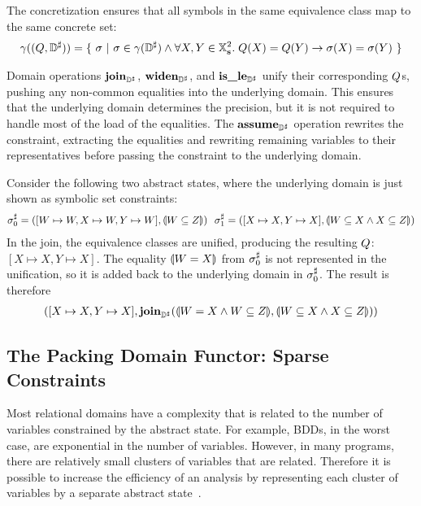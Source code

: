 The concretization ensures that all symbols in the same equivalence class map to the same concrete set:
\begin{align*}
\gamma((Q,{\mathbb{D}}^{\sharp})) = \{ \ \sigma \ | \ \sigma \in \gamma({\mathbb{D}}^{\sharp}) \wedge \forall X,Y \in \mathbb{X}_{\bf s}^2. \; Q(X) = Q(Y) \rightarrow \sigma(X) = \sigma(Y) \ \}
\end{align*}

Domain operations $\textbf{join}_{{\mathbb{D}}^{\sharp}}$, $\textbf{widen}_{{\mathbb{D}}^{\sharp}}$, and $\textbf{is\_le}_{{\mathbb{D}}^{\sharp}}$ unify their corresponding $Q$s, pushing any non-common equalities into the underlying domain.  This ensures that the underlying domain determines the precision, but it is not required to handle most of the load of the equalities.  The $\textbf{assume}_{{\mathbb{D}}^{\sharp}}$ operation rewrites the constraint, extracting the equalities and rewriting remaining variables to their representatives before passing the constraint to the underlying domain.
 

\begin{example}
Consider the following two abstract states, where the underlying domain is just shown as symbolic set constraints:
\begin{align*}
  \astate_0 = ([W \mapsto W, X \mapsto W, Y \mapsto W], \aform{W \subseteq Z}) \ \ 
  \astate_1 = ([X \mapsto X, Y \mapsto X], \aform{W \subseteq X \wedge X \subseteq Z})
\end{align*}
In the join, the equivalence classes are unified, producing the resulting $Q$: $[X \mapsto X, Y \mapsto X]$.  The equality $\llparenthesis W = X \rrparenthesis$ from ${\sigma}^{\sharp}_0$ is not represented in the unification, so it is added back to the underlying domain in ${\sigma}^{\sharp}_0$.  The result is therefore
\begin{align*}
  ([X \mapsto X, Y \mapsto X], \textbf{join}_{{\mathbb{D}}^{\sharp}}(\llparenthesis W = X \wedge W \subseteq Z \rrparenthesis, \llparenthesis W \subseteq X \wedge X \subseteq Z \rrparenthesis))
\end{align*}
\end{example}

\subsection{The Packing Domain Functor: Sparse Constraints}
\label{s:4:5:packs}
Most relational domains have a complexity that is related to the number of variables constrained by the abstract state.  For example, BDDs, in the worst case, are exponential in the number of variables.  However, in many programs, there are relatively small clusters of variables that are related.  Therefore it is possible to increase the efficiency of an analysis by representing each cluster of variables by a separate abstract state~\cite{ens:pldi:03}.

